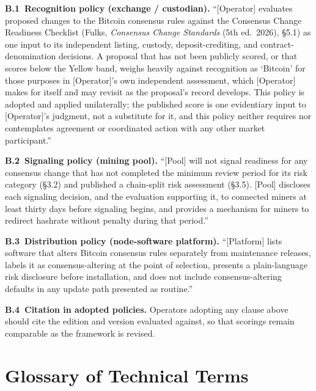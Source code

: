 \documentclass[11pt, twoside, openright]{book}
\newcommand{\reqitem}[2]{\medskip\noindent\textbf{#1\ #2}\quad\ignorespaces}
\newcommand{\sect}[1]{\S#1}
\begin{document}
\reqitem{B.1}{Recognition policy (exchange / custodian).} ``[Operator] evaluates proposed changes to the Bitcoin consensus rules against the Consensus Change Readiness Checklist (Fulks, \textit{Consensus Change Standards} (5th ed.~2026), \sect{5.1}) as one input to its independent listing, custody, deposit-crediting, and contract-denomination decisions. A proposal that has not been publicly scored, or that scores below the Yellow band, weighs heavily against recognition as `Bitcoin' for those purposes in [Operator]'s own independent assessment, which [Operator] makes for itself and may revisit as the proposal's record develops. This policy is adopted and applied unilaterally; the published score is one evidentiary input to [Operator]'s judgment, not a substitute for it, and this policy neither requires nor contemplates agreement or coordinated action with any other market participant.''

\reqitem{B.2}{Signaling policy (mining pool).} ``[Pool] will not signal readiness for any consensus change that has not completed the minimum review period for its risk category (\sect{3.2}) and published a chain-split risk assessment (\sect{3.5}). [Pool] discloses each signaling decision, and the evaluation supporting it, to connected miners at least thirty days before signaling begins, and provides a mechanism for miners to redirect hashrate without penalty during that period.''

\reqitem{B.3}{Distribution policy (node-software platform).} ``[Platform] lists software that alters Bitcoin consensus rules separately from maintenance releases, labels it as consensus-altering at the point of selection, presents a plain-language risk disclosure before installation, and does not include consensus-altering defaults in any update path presented as routine.''

\reqitem{B.4}{Citation in adopted policies.} Operators adopting any clause above should cite the edition and version evaluated against, so that scorings remain comparable as the framework is revised.

\chapter{Glossary of Technical Terms}\label{glossary}
\end{document}
